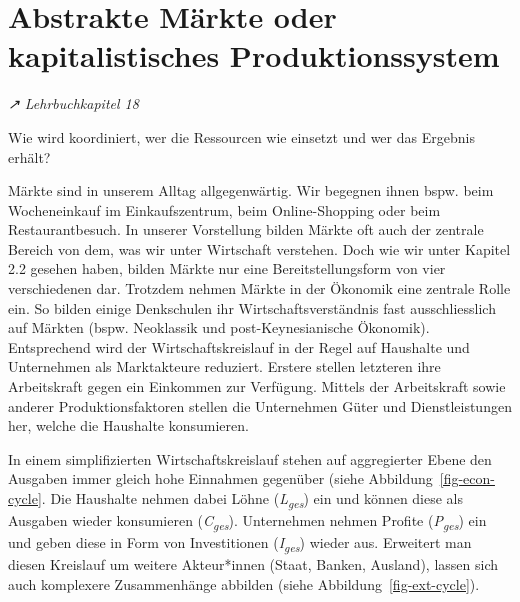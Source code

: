 \documentclass[
  nswissgerman,
  a4paper,
  DIV=11,
  numbers=noendperiod,
  oneside,
  openany]{scrreprt}
\begin{document}
\section{Abstrakte Märkte oder kapitalistisches
Produktionssystem}\label{abstrakte-muxe4rkte-oder-kapitalistisches-produktionssystem}

\emph{↗ Lehrbuchkapitel 18}

\begin{tcolorbox}[enhanced jigsaw, arc=.35mm, bottomrule=.15mm, bottomtitle=1mm, breakable, colback=white, colbacktitle=quarto-callout-note-color!10!white, colframe=quarto-callout-note-color-frame, coltitle=black, left=2mm, leftrule=.75mm, opacityback=0, opacitybacktitle=0.6, rightrule=.15mm, title={Leitfrage}, titlerule=0mm, toprule=.15mm, toptitle=1mm]

Wie wird koordiniert, wer die Ressourcen wie einsetzt und wer das
Ergebnis erhält?

\end{tcolorbox}

Märkte sind in unserem Alltag allgegenwärtig. Wir begegnen ihnen bspw.
beim Wocheneinkauf im Einkaufszentrum, beim Online-Shopping oder beim
Restaurantbesuch. In unserer Vorstellung bilden Märkte oft auch der
zentrale Bereich von dem, was wir unter Wirtschaft verstehen. Doch wie
wir unter Kapitel 2.2 gesehen haben, bilden Märkte nur eine
Bereitstellungsform von vier verschiedenen dar. Trotzdem nehmen Märkte
in der Ökonomik eine zentrale Rolle ein. So bilden einige Denkschulen
ihr Wirtschaftsverständnis fast ausschliesslich auf Märkten (bspw.
Neoklassik und post-Keynesianische Ökonomik). Entsprechend wird der
Wirtschaftskreislauf in der Regel auf Haushalte und Unternehmen als
Marktakteure reduziert. Erstere stellen letzteren ihre Arbeitskraft
gegen ein Einkommen zur Verfügung. Mittels der Arbeitskraft sowie
anderer Produktionsfaktoren stellen die Unternehmen Güter und
Dienstleistungen her, welche die Haushalte konsumieren.

In einem simplifizierten Wirtschaftskreislauf stehen auf aggregierter
Ebene den Ausgaben immer gleich hohe Einnahmen gegenüber (siehe
Abbildung~\ref{fig-econ-cycle}. Die Haushalte nehmen dabei Löhne
(\emph{L\textsubscript{ges}}) ein und können diese als Ausgaben wieder
konsumieren (\emph{C\textsubscript{ges}}). Unternehmen nehmen Profite
(\emph{P\textsubscript{ges}}) ein und geben diese in Form von
Investitionen (\emph{I\textsubscript{ges}}) wieder aus. Erweitert man
diesen Kreislauf um weitere Akteur*innen (Staat, Banken, Ausland),
lassen sich auch komplexere Zusammenhänge abbilden (siehe
Abbildung~\ref{fig-ext-cycle}).
\end{document}
